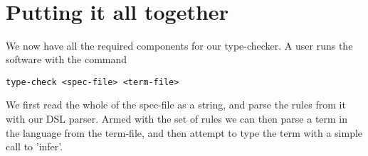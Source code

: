 {\begin{code}
\AgdaSpace{}%
\AgdaSymbol{\#-\}}\<%
\\
%
\>[2]\AgdaSpace{}%
\AgdaSpace{}%
\AgdaSymbol{=}\AgdaSpace{}%
%
\>[793I]\AgdaSymbol{(}\AgdaSpace{}%
\AgdaSymbol{(}\AgdaSpace{}%
\AgdaSymbol{)}\AgdaSpace{}%
\<%
\\
\>[793I][@{}l@{\AgdaIndent{0}}]%
\>[37]\AgdaSpace{}%
\AgdaSymbol{(}\AgdaSpace{}%
\AgdaSymbol{)}\AgdaSpace{}%
\<%
\\
%
\>[37]\AgdaSpace{}%
\AgdaSpace{}%
\<%
\\
%
\>[37]\AgdaInductiveConstructor{[]}\AgdaSymbol{)}\<%
\end{code}
}
\section{Putting it all together}
We now have all the required components for our type-checker. A user runs the software
with the command \begin{verbatim}type-check <spec-file> <term-file>\end{verbatim}We
first read the whole of the spec-file as a string, and parse the rules from it with
our DSL parser. Armed with the set of rules we can then parse a term in the language
from the term-file, and then attempt to type the term with a simple call to 'infer'.

